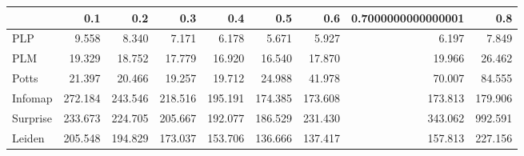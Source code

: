\begin{tabular}{lrrrrrrrr}
\toprule
{} &     0.1 &     0.2 &     0.3 &     0.4 &     0.5 &     0.6 & 0.7000000000000001 &     0.8 \\
\midrule
PLP      &   9.558 &   8.340 &   7.171 &   6.178 &   5.671 &   5.927 &              6.197 &   7.849 \\
PLM      &  19.329 &  18.752 &  17.779 &  16.920 &  16.540 &  17.870 &             19.966 &  26.462 \\
Potts    &  21.397 &  20.466 &  19.257 &  19.712 &  24.988 &  41.978 &             70.007 &  84.555 \\
Infomap  & 272.184 & 243.546 & 218.516 & 195.191 & 174.385 & 173.608 &            173.813 & 179.906 \\
Surprise & 233.673 & 224.705 & 205.667 & 192.077 & 186.529 & 231.430 &            343.062 & 992.591 \\
Leiden   & 205.548 & 194.829 & 173.037 & 153.706 & 136.666 & 137.417 &            157.813 & 227.156 \\
\bottomrule
\end{tabular}
